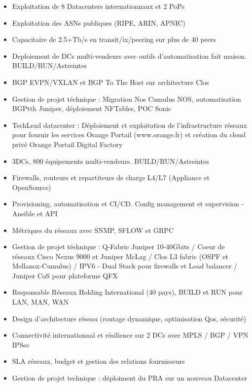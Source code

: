 \documentclass[10pt,a4paper,ragged2e,withhyper]{altacv}
\begin{document}
\begin{paracol}{2}
\begin{itemize}
\item Exploitation de 8 Datacenters internationnaux et 2 PoPs
\item Exploitation des ASNs publiques (RIPE, ARIN, APNIC)
\item Capacitaire de 2.5+Tb/s en transit/ix/peering sur plus de 40 peers
\item Deploiement de DCs multi-vendeurs avec outils d'automatisation fait maison. BUILD/RUN/Astreintes
\item BGP EVPN/VXLAN et BGP To The Host sur architecture Clos
\item Gestion de projet téchnique : Migration Nos Cumulus NOS, automatisation BGPtth Juniper, déploiement NFTables, POC Sonic
\end{itemize}
\begin{itemize}
\item TechLead datacenter : Déploiement et exploitation de l'infrastructure réseaux pour fournir les services Orange Portail (www.orange.fr) et création du cloud privé Orange Portail Digital Factory
\item 3DCs, 800 équipements multi-vendeurs. BUILD/RUN/Astreintes
\item Firewalls, routeurs et repartiteurs de charge L4/L7 (Appliance et OpenSource)
\item Provisioning, automatisation et CI/CD. Config management et supervision - Ansible et API
\item Métriques du réseaux avec SNMP, SFLOW et GRPC
\item Gestion de projet téchnique : Q-Fabric Juniper 10-40Gbits / Coeur de réseaux Cisco Nexus 9000 et Juniper McLag / Clos L3 fabric (OSPF et Mellanox-Cumulus) / IPV6 - Dual Stack pour firewalls et Load balancer / Juniper CoS pour plateforme QFX
\end{itemize}
\begin{itemize}
\item Responsable Réseaux Holding International (40 pays), BUILD et RUN pour LAN, MAN, WAN
\item Design d'architecture réseau (routage dynamique, optimisation Qos, sécurité)
\item Connectivité internationnal et résilience sur 2 DCs avec MPLS / BGP / VPN IPSec
\item SLA réseaux, budget et gestion des relations fournisseurs
\item Gestion de projet technique : déploiment du PRA sur un nouveau Datacenter
\end{itemize}


\end{paracol}
\end{document}
